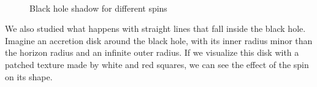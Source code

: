 \begin{figure}[bth]
	\myfloatalign
	 \quad
	 \\
	 \quad
	\caption[Black hole shadow for different spins]{Black hole shadow for different spins}\label{fig:shadow}
\end{figure}

We also studied what happens with straight lines that fall inside the black hole. Imagine an accretion disk around the black hole, with its inner radius minor than the horizon radius and an infinite outer radius. If we visualize this disk with a patched texture made by white and red squares, we can see the effect of the spin on its shape.


